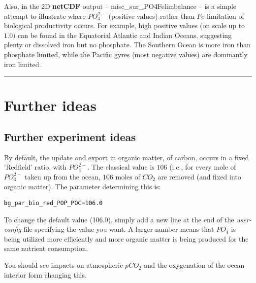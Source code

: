 \vspace{1mm}
Also, in the  2D \textbf{netCDF} output -- \textsf{\footnotesize misc\_sur\_PO4Felimbalance} -- is a simple attempt to illustrate where \(PO^{2-}_{4}\) (positive values) rather than \(Fe\) limitation of biological productivity occurs. For example, high positive values (on scale up to \(1.0)\) can be found in the Equatorial Atlantic and Indian Oceans, suggesting plenty or dissolved iron but no phosphate. The Southern Ocean is more iron than phosphate limited, while the Pacific gyres (most negative values) are dominantly iron limited.

\vspace{1mm} \noindent\rule{4cm}{0.1mm} \vspace{2mm}

\newpage

\section{Further ideas}


\subsection{Further experiment ideas}

\noindent By default, the update and export in organic matter, of carbon, occurs in a fixed 'Redfield' ratio, with \(PO^{2-}_{4}\). The classical value is \(106\) (i.e., for every mole of \(PO^{2-}_{4}\) taken up from the ocean, \(106\) moles of \(CO_{2}\) are removed (and fixed into organic matter). The parameter determining this is:
\vspace{-2mm}\small\begin{verbatim}
bg_par_bio_red_POP_POC=106.0
\end{verbatim}\normalsize\vspace{-2mm}
To change the default value (106.0), simply add a new line at the end of the \textit{user-config} file specifying the value you want. A larger number means that \(PO_{4}\) is being utilized more efficiently and more organic matter is being produced for the same nutrient consumption.

You should see impacts on atmospheric \(pCO_{2}\) and the oxygenation of the ocean interior form changing this.

